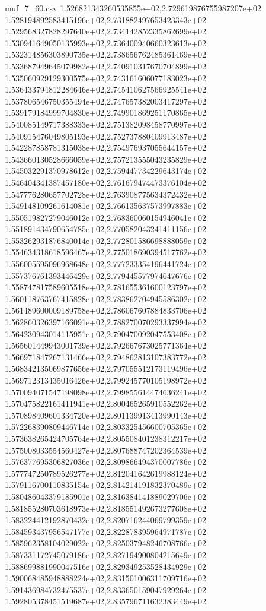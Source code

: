 \begin{filecontents*}{muf_7_60.csv}
1.526821343260535855e+02,2.729619876755987207e+02
1.528194892583415196e+02,2.731882497653423343e+02
1.529568327828297640e+02,2.734142852335862699e+02
1.530941649050135993e+02,2.736400940660323613e+02
1.532314856303890735e+02,2.738656762485361469e+02
1.533687949645079982e+02,2.740910317670704899e+02
1.535060929129300575e+02,2.743161606077183023e+02
1.536433794812284646e+02,2.745410627566925541e+02
1.537806546750355494e+02,2.747657382003417297e+02
1.539179184999704830e+02,2.749901869251170865e+02
1.540085149717388333e+02,2.751382098458770997e+02
1.540915476049805193e+02,2.752737880409913487e+02
1.542287858781315038e+02,2.754976937055644157e+02
1.543660130528666059e+02,2.757213555043235829e+02
1.545032291370978612e+02,2.759447734229643174e+02
1.546404341387457180e+02,2.761679474473376104e+02
1.547776280657702728e+02,2.763908775634372432e+02
1.549148109261614081e+02,2.766135637573997883e+02
1.550519827279046012e+02,2.768360060154946041e+02
1.551891434790654785e+02,2.770582043241411156e+02
1.553262931876840014e+02,2.772801586698888059e+02
1.554634318618596467e+02,2.775018690394517762e+02
1.556005595096968648e+02,2.777233354196441724e+02
1.557376761393446429e+02,2.779445577974647676e+02
1.558747817589605518e+02,2.781655361600123797e+02
1.560118763767415828e+02,2.783862704945586302e+02
1.561489600009189758e+02,2.786067607884833706e+02
1.562860326397166091e+02,2.788270070293337994e+02
1.564230943014115951e+02,2.790470092047553408e+02
1.565601449943001739e+02,2.792667673025771364e+02
1.566971847267131466e+02,2.794862813107383772e+02
1.568342135069877656e+02,2.797055512173119496e+02
1.569712313435016426e+02,2.799245770105198972e+02
1.570094071547198098e+02,2.799855614474636241e+02
1.570475822161411941e+02,2.800465265910552262e+02
1.570898409601334720e+02,2.801139913413990143e+02
1.572268390809446714e+02,2.803325456600705365e+02
1.573638265424705764e+02,2.805508401238312217e+02
1.575008033554560427e+02,2.807688747202364539e+02
1.576377695306827036e+02,2.809866494370007786e+02
1.577747250789526277e+02,2.812041642619988124e+02
1.579116700110835154e+02,2.814214191832370489e+02
1.580486043379185901e+02,2.816384141889029706e+02
1.581855280703618973e+02,2.818551492673277608e+02
1.583224412192870432e+02,2.820716244069799359e+02
1.584593437956547177e+02,2.822878395964971787e+02
1.585962358104029022e+02,2.825037948246708766e+02
1.587331172745079186e+02,2.827194900804215649e+02
1.588699881990047516e+02,2.829349253528434929e+02
1.590068485948888224e+02,2.831501006311709716e+02
1.591436984732475537e+02,2.833650159047929264e+02
1.592805378451519687e+02,2.835796711632383449e+02

\end{filecontents*}
